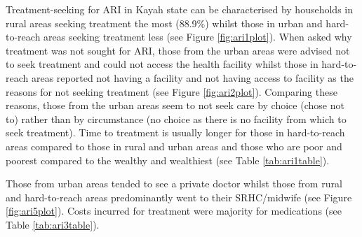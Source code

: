 \documentclass[12pt,a4paper]{article}
\begin{document}
Treatment-seeking for ARI in Kayah state can be characterised by households in rural areas seeking treatment the most (88.9\%) whilst those in urban and hard-to-reach areas seeking treatment less (see Figure \ref{fig:ari1plot}). When asked why treatment was not sought for ARI, those from the urban areas were advised not to seek treatment and could not access the health facility whilst those in hard-to-reach areas reported not having a facility and not having access to facility as the reasons for not seeking treatment (see Figure \ref{fig:ari2plot}). Comparing these reasons, those from the urban areas seem to not seek care by choice (chose not to) rather than by circumstance (no choice as there is no facility from which to seek treatment). Time to treatment is usually longer for those in hard-to-reach areas compared to those in rural and urban areas and those who are poor and poorest compared to the wealthy and wealthiest (see Table \ref{tab:ari1table}).

Those from urban areas tended to see a private doctor whilst those from rural and hard-to-reach areas predominantly went to their SRHC/midwife (see Figure \ref{fig:ari5plot}). Costs incurred for treatment were majority for medications (see Table \ref{tab:ari3table}).
\end{document}
